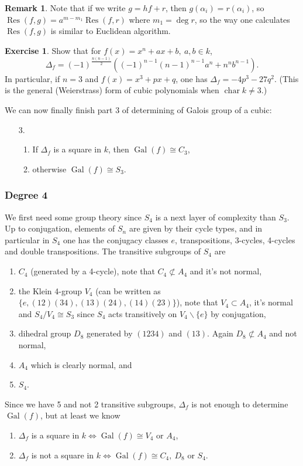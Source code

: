 \documentclass{article}
\newcommand{\Char}{\operatorname{char}}
\newcommand{\Gal}{\operatorname{Gal}}
\newcommand{\Res}{\operatorname{Res}}
\theoremstyle{definition}
\newtheorem{exe}[defn]{Exercise}
\newtheorem{remark}[defn]{Remark}
\begin{document}
\begin{remark}
Note that if we write $g=hf+r$, then $g(\alpha_i)=r(\alpha_i)$, so $\Res(f,g)=a^{m-m_1}\Res(f,r)$ where $m_1=\deg r$, so the way one calculates $\Res(f,g)$ is similar to Euclidean algorithm.
\end{remark}

\begin{exe}
Show that for $f(x)=x^n+ax+b,\ a,b\in k$,
\[
\Delta_f=(-1)^{\frac{n(n-1)}{2}}\left((-1)^{n-1}(n-1)^{n-1}a^n+n^nb^{n-1}\right).
\]
In particular, if $n=3$ and $f(x)=x^3+px+q$, one has $\Delta_f=-4p^3-27q^2$. (This is the general (Weierstrass) form of cubic polynomials when $\Char k\neq 3$.)
\end{exe}

We can now finally finish part 3 of determining of Galois group of a cubic:
\begin{enumerate}
\item[3.] \begin{enumerate}
\item If $\Delta_f$ is a square in $k$, then $\Gal(f)\cong C_3$,
\item otherwise $\Gal(f)\cong S_3$.
\end{enumerate}
\end{enumerate}

\subsubsection{Degree 4}
We first need some group theory since $S_4$ is a next layer of complexity than $S_3$. Up to conjugation, elements of $S_n$ are given by their cycle types, and in particular in $S_4$ one has the conjugacy classes $e$, transpositions, 3-cycles, 4-cycles and double transpositions. The transitive subgroups of $S_4$ are
\begin{enumerate}
\item $C_4$ (generated by a 4-cycle), note that $C_4\not\subset A_4$ and it's not normal,
\item the Klein 4-group $V_4$ (can be written as $\{e,(12)(34),(13)(24),(14)(23)\}$), note that $V_4\subset A_4$, it's normal and $S_4/V_4\cong S_3$ since $S_4$ acts transitively on $V_4\backslash\{e\}$ by conjugation,
\item dihedral group $D_8$ generated by $(1234)$ and $(13)$. Again $D_8\not\subset A_4$ and not normal,
\item $A_4$ which is clearly normal, and
\item $S_4$.
\end{enumerate}
Since we have 5 and not 2 transitive subgroups, $\Delta_f$ is not enough to determine $\Gal(f)$, but at least we know
\begin{enumerate}
\item $\Delta_f$ is a square in $k\iff \Gal(f)\cong V_4$ or $A_4$,
\item $\Delta_f$ is not a square in $k\iff \Gal(f)\cong C_4,\ D_8$ or $S_4$.
\end{enumerate}
\end{document}
